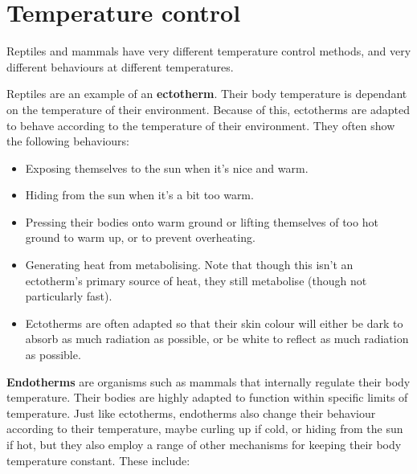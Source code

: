 \documentclass{article}
\begin{document}
\section*{Temperature control}

Reptiles and mammals have very different temperature control methods, and very
different behaviours at different temperatures.

Reptiles are an example of an {\bf ectotherm}. Their body temperature is
dependant on the temperature of their environment. Because of this, ectotherms
are adapted to behave according to the temperature of their environment. They
often show the following behaviours:

\begin{itemize}

	\item Exposing themselves to the sun when it's nice and warm.

	\item Hiding from the sun when it's a bit too warm.

	\item Pressing their bodies onto warm ground or lifting themselves of too
	hot ground to warm up, or to prevent overheating.

	\item Generating heat from metabolising. Note that though this isn't an
	ectotherm's primary source of heat, they still metabolise (though not
	particularly fast).

	\item Ectotherms are often adapted so that their skin colour will either be
	dark to absorb as much radiation as possible, or be white to reflect as
	much radiation as possible.

\end{itemize}

{\bf Endotherms} are organisms such as mammals that internally regulate their
body temperature. Their bodies are highly adapted to function within specific
limits of temperature. Just like ectotherms, endotherms also change their
behaviour according to their temperature, maybe curling up if cold, or hiding
from the sun if hot, but they also employ a range of other mechanisms for
keeping their body temperature constant. These include:
\end{document}
